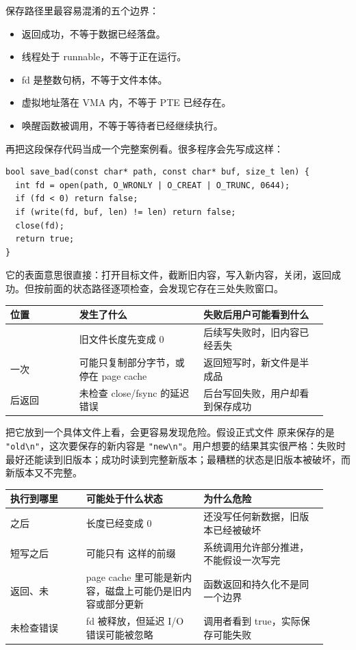 \begin{warningbox}
保存路径里最容易混淆的五个边界：
\begin{itemize}
\tightlist
\item {} 返回成功，不等于数据已经落盘。
\item 线程处于 runnable，不等于正在运行。
\item fd 是整数句柄，不等于文件本体。
\item 虚拟地址落在 VMA 内，不等于 PTE 已经存在。
\item 唤醒函数被调用，不等于等待者已经继续执行。
\end{itemize}
\end{warningbox}

再把这段保存代码当成一个完整案例看。很多程序会先写成这样：

\begin{lstlisting}
bool save_bad(const char* path, const char* buf, size_t len) {
  int fd = open(path, O_WRONLY | O_CREAT | O_TRUNC, 0644);
  if (fd < 0) return false;
  if (write(fd, buf, len) != len) return false;
  close(fd);
  return true;
}
\end{lstlisting}

它的表面意思很直接：打开目标文件，截断旧内容，写入新内容，关闭，返回成功。但按前面的状态路径逐项检查，会发现它存在三处失败窗口。

\begin{longtable}{|L{0.2\linewidth}|L{0.36\linewidth}|L{0.36\linewidth}|}
\toprule
位置 & 发生了什么 & 失败后用户可能看到什么 \\
\midrule
{} & 旧文件长度先变成 0 & 后续写失败时，旧内容已经丢失 \\\tablerowrule
一次  & 可能只复制部分字节，或停在 page cache & 返回短写时，新文件是半成品 \\\tablerowrule
{} 后返回 & 未检查 close/fsync 的延迟错误 & 后台写回失败，用户却看到保存成功 \\
\bottomrule
\end{longtable}

把它放到一个具体文件上看，会更容易发现危险。假设正式文件  原来保存的是 \verb|"old\n"|，这次要保存的新内容是 \verb|"new\n"|。用户想要的结果其实很严格：失败时最好还能读到旧版本；成功时读到完整新版本；最糟糕的状态是旧版本被破坏，而新版本又不完整。

\begin{longtable}{|L{0.22\linewidth}|L{0.34\linewidth}|L{0.36\linewidth}|}
\toprule
执行到哪里 &  可能处于什么状态 & 为什么危险 \\
\midrule
{} 之后 & 长度已经变成 0 & 还没写任何新数据，旧版本已经被破坏 \\\tablerowrule
{} 短写之后 & 可能只有  这样的前缀 & 系统调用允许部分推进，不能假设一次写完 \\\tablerowrule
{} 返回、未  & page cache 里可能是新内容，磁盘上可能仍是旧内容或部分更新 & 函数返回和持久化不是同一个边界 \\\tablerowrule
{} 未检查错误 & fd 被释放，但延迟 I/O 错误可能被忽略 & 调用者看到 true，实际保存可能失败 \\
\bottomrule
\end{longtable}

